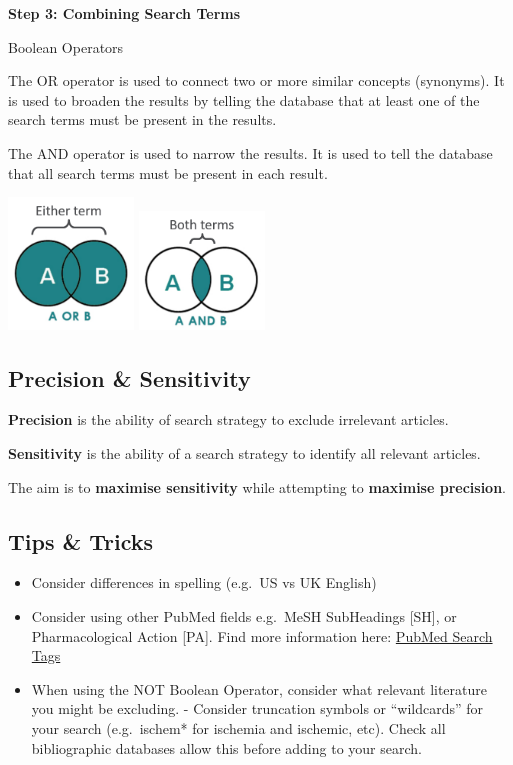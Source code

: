 \documentclass[
]{book}
\providecommand{\tightlist}{%
  \setlength{\itemsep}{0pt}\setlength{\parskip}{0pt}}
\begin{document}
\textbf{Step 3: Combining Search Terms}

Boolean Operators

The OR operator is used to connect two or more similar concepts (synonyms). It is used to broaden the results by telling the database that at least one of the search terms must be present in the results.

The AND operator is used to narrow the results. It is used to tell the database that all search terms must be present in each result.

\includegraphics[width=0.25\textwidth,height=0.25\textheight]{figs/booleanOR.png}
\includegraphics[width=0.25\textwidth,height=0.25\textheight]{figs/booleanAND.png}

\hypertarget{precision-sensitivity}{%
\subsection{Precision \& Sensitivity}\label{precision-sensitivity}}

\textbf{Precision} is the ability of search strategy to exclude irrelevant articles.

\textbf{Sensitivity} is the ability of a search strategy to identify all relevant articles.

The aim is to \textbf{maximise sensitivity} while attempting to \textbf{maximise precision}.

\hypertarget{tips-tricks}{%
\subsection{Tips \& Tricks}\label{tips-tricks}}

\begin{itemize}
\tightlist
\item
  Consider differences in spelling (e.g.~US vs UK English)
\item
  Consider using other PubMed fields e.g.~MeSH SubHeadings {[}SH{]}, or Pharmacological Action {[}PA{]}. Find more information here: \href{https://pubmed.ncbi.nlm.nih.gov/help/\#search-tags}{PubMed Search Tags}
\item
  When using the NOT Boolean Operator, consider what relevant literature you might be excluding. - Consider truncation symbols or ``wildcards'' for your search (e.g.~ischem* for ischemia and ischemic, etc). Check all bibliographic databases allow this before adding to your search.
\end{itemize}
\end{document}
